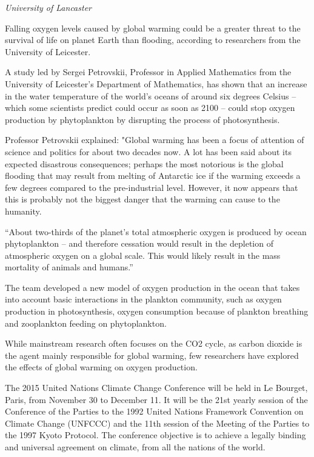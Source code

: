\documentclass[
]{book}
\begin{document}
\emph{University of Lancaster}

Falling oxygen levels caused by global warming could be a greater threat to the survival of life on planet Earth than flooding, according to researchers from the University of Leicester.

A study led by Sergei Petrovskii, Professor in Applied Mathematics from the University of Leicester's Department of Mathematics, has shown that an increase in the water temperature of the world's oceans of around six degrees Celsius -- which some scientists predict could occur as soon as 2100 -- could stop oxygen production by phytoplankton by disrupting the process of photosynthesis.

Professor Petrovskii explained: "Global warming has been a focus of attention of science and politics for about two decades now. A lot has been said about its expected disastrous consequences; perhaps the most notorious is the global flooding that may result from melting of Antarctic ice if the warming exceeds a few degrees compared to the pre-industrial level. However, it now appears that this is probably not the biggest danger that the warming can cause to the humanity.

``About two-thirds of the planet's total atmospheric oxygen is produced by ocean phytoplankton -- and therefore cessation would result in the depletion of atmospheric oxygen on a global scale. This would likely result in the mass mortality of animals and humans.''

The team developed a new model of oxygen production in the ocean that takes into account basic interactions in the plankton community, such as oxygen production in photosynthesis, oxygen consumption because of plankton breathing and zooplankton feeding on phytoplankton.

While mainstream research often focuses on the CO2 cycle, as carbon dioxide is the agent mainly responsible for global warming, few researchers have explored the effects of global warming on oxygen production.

The 2015 United Nations Climate Change Conference will be held in Le Bourget, Paris, from November 30 to December 11. It will be the 21st yearly session of the Conference of the Parties to the 1992 United Nations Framework Convention on Climate Change (UNFCCC) and the 11th session of the Meeting of the Parties to the 1997 Kyoto Protocol. The conference objective is to achieve a legally binding and universal agreement on climate, from all the nations of the world.
\end{document}

